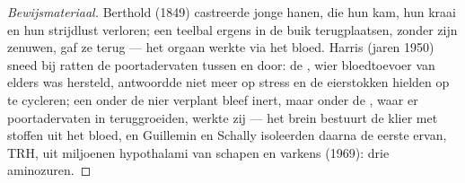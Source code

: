 \begin{proof}[Bewijsmateriaal]
Berthold (1849) castreerde jonge hanen, die hun kam, hun kraai en hun
strijdlust verloren; een teelbal ergens in de buik terugplaatsen,
zonder zijn zenuwen, gaf ze terug --- het orgaan werkte via het bloed.
Harris (jaren 1950) sneed bij ratten de poortadervaten tussen
 en  door: de , wier bloedtoevoer van
elders was hersteld, antwoordde niet meer op stress en de eierstokken
hielden op te cycleren; een  onder de nier verplant bleef
inert, maar onder de , waar er poortadervaten in
teruggroeiden, werkte zij --- het brein bestuurt de klier met stoffen
uit het bloed, en Guillemin en Schally isoleerden daarna de eerste
ervan, TRH, uit miljoenen hypothalami van schapen en varkens (1969):
drie aminozuren.
\end{proof}

